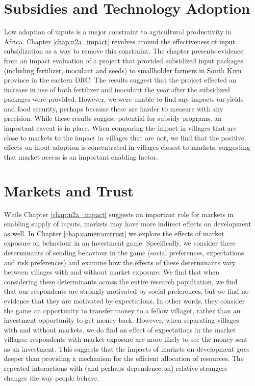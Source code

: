 \section{Subsidies and Technology Adoption}
Low adoption of  inputs is a major constraint to agricultural productivity in Africa. Chapter \ref{chap:n2a_impact} revolves around the effectiveness of input subsidization as a way to remove this constraint. The chapter presents evidence from an impact evaluation of a project that provided subsidized input packages (including fertilizer, inoculant and seeds) to smallholder farmers in South Kivu province in the eastern DRC. The results suggest that the project effected an increase in use of both fertilizer and inoculant the year after the subsidized packages were provided. However, we were unable to find any impacts on yields and food security, perhaps because these are harder to measure with any precision. While these results suggest potential for subsidy programs, an important caveat is in place. When comparing the impact in villages that are close to markets to the impact in villages that are not, we find that the positive effects on input adoption is concentrated in villages closest to markets, suggesting that market access is an important enabling factor.  

\section{Markets and Trust}
While Chapter \ref{chap:n2a_impact} suggests an important role for markets in enabling supply of inputs, markets may have more indirect effects on development as well. In  Chapter \ref{chap:cameroontrust} we explore the effects of market exposure on behaviour in an investment game. Specifically, we consider three determinants of sending behaviour in the game (social preferences, expectations and risk preferences) and examine how the effects of these determinants vary between villages with and without market exposure. We find that when considering these determinants across the entire research popultation, we find that our respondents are strongly motivated by social preferences, but we find no evidence that they are motivated by expectations. In other words, they consider the game an opportunity to transfer money to a fellow villager, rather than an investment opportunity to get money back. However, when separating villages with and without markets, we do find an effect of expectations in the market villages: respondents with market exposure are more likely to see the money sent as an investment. This suggests that the impacts of markets on development goes deeper than providing a mechanism for the efficient allocation of resources. The repeated interactions with (and perhaps dependence on) relative strangers changes the way people behave. 


